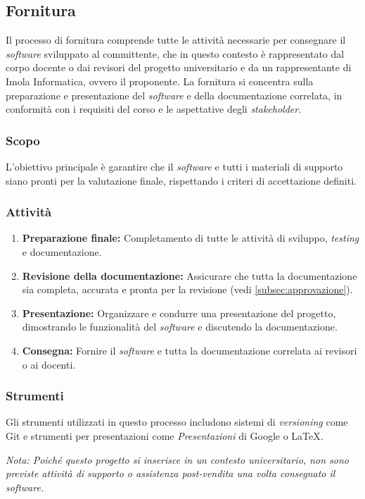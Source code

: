 \subsection{Fornitura}

Il processo di fornitura comprende tutte le attività necessarie per consegnare
il \textit{software} sviluppato al committente, che in questo contesto è
rappresentato dal corpo docente o dai revisori del progetto universitario e da
un rappresentante di Imola Informatica, ovvero il proponente.
La fornitura si concentra sulla preparazione e
presentazione del \textit{software} e della documentazione correlata, in
conformità con i requisiti del corso e le aspettative degli \textit{stakeholder}.

\subsubsection{Scopo}
L'obiettivo principale è garantire che il \textit{software} e tutti i materiali
di supporto siano pronti per la valutazione finale, rispettando i criteri di
accettazione definiti.

\subsubsection{Attività}
\begin{enumerate}
	\item \textbf{Preparazione finale:} Completamento di tutte le attività di
	      sviluppo, \textit{testing} e documentazione.
	\item \textbf{Revisione della documentazione:} Assicurare che tutta la
	      documentazione sia completa, accurata e pronta per la revisione
	      (vedi \cref{subsec:approvazione}).
	\item \textbf{Presentazione:} Organizzare e condurre una presentazione del
	      progetto, dimostrando le funzionalità del \textit{software} e
	      discutendo la documentazione.
	\item \textbf{Consegna:} Fornire il \textit{software} e tutta la
	      documentazione correlata ai revisori o ai docenti.
\end{enumerate}

\subsubsection{Strumenti}
Gli strumenti utilizzati in questo processo includono sistemi di
\textit{versioning} come Git e strumenti per presentazioni come
\textit{Presentazioni} di Google o LaTeX.

\textit{Nota: Poiché questo progetto si inserisce in un contesto universitario,
	non sono previste attività di supporto o assistenza post-vendita una volta
	consegnato il \textit{software}.}
